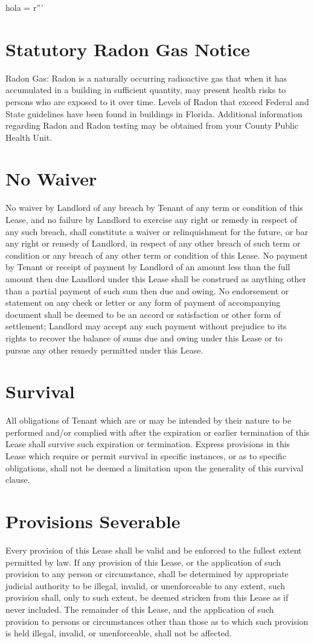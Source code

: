 hola = r'''\documentclass{article}
\begin{document}
\section{Statutory Radon Gas Notice}
    Radon Gas: Radon is a naturally occurring radioactive gas that when it has accumulated in a building in sufficient quantity, may present health risks to persons who are exposed to it over time. Levels of Radon that exceed Federal and State guidelines have been found in buildings in Florida. Additional information regarding Radon and Radon testing may be obtained from your County Public Health Unit.

\section{No Waiver}
    No waiver by Landlord of any breach by Tenant of any term or condition of this Lease, and no failure by Landlord to exercise any right or remedy in respect of any such breach, shall constitute a waiver or relinquishment for the future, or bar any right or remedy of Landlord, in respect of any other breach of such term or condition or any breach of any other term or condition of this Lease. No payment by Tenant or receipt of payment by Landlord of an amount less than the full amount then due Landlord under this Lease shall be construed as anything other than a partial payment of such sum then due and owing. No endorsement or statement on any check or letter or any form of payment of accompanying document shall be deemed to be an accord or satisfaction or other form of settlement; Landlord may accept any such payment without prejudice to its rights to recover the balance of sums due and owing under this Lease or to pursue any other remedy permitted under this Lease.


\section{Survival}
    All obligations of Tenant which are or may be intended by their nature to be performed and/or complied with after the expiration or earlier termination of this Lease shall survive such expiration or termination. Express provisions in this Lease which require or permit survival in specific instances, or as to specific obligations, shall not be deemed a limitation upon the generality of this survival clause.

\section{Provisions Severable}
    Every provision of this Lease shall be valid and be enforced to the fullest extent permitted by law. If any provision of this Lease, or the application of such provision to any person or circumstance, shall be determined by appropriate judicial authority to be illegal, invalid, or unenforceable to any extent, such provision shall, only to such extent, be deemed stricken from this Lease as if never included. The remainder of this Lease, and the application of such provision to persons or circumstances other than those as to which such provision is held illegal, invalid, or unenforceable, shall not be affected.
\end{document}
